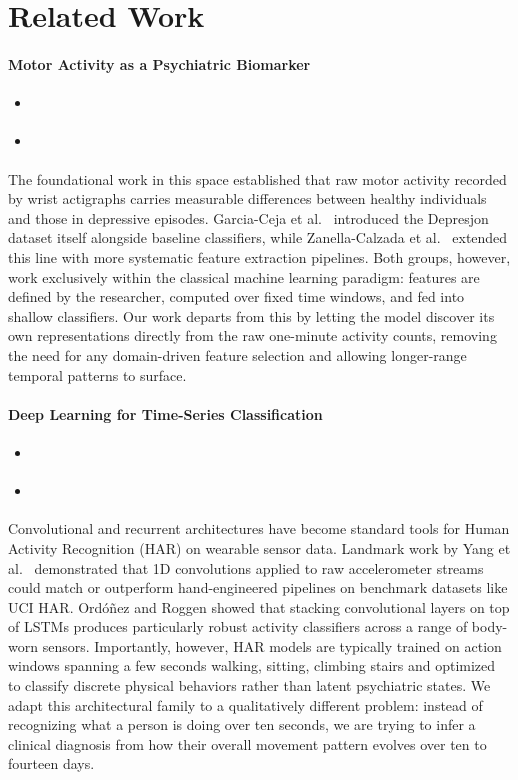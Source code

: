 \section{Related Work}

\paragraph{Motor Activity as a Psychiatric Biomarker}
\begin{itemize}
    \item \cite{garcia2018depresjon}
    \item \cite{zanella2019feature}
\end{itemize}
The foundational work in this space established that raw motor activity recorded by wrist actigraphs carries measurable differences between healthy individuals and those in depressive episodes. Garcia-Ceja et al.\ \cite{garcia2018depresjon} introduced the Depresjon dataset itself alongside baseline classifiers, while Zanella-Calzada et al.\ \cite{zanella2019feature} extended this line with more systematic feature extraction pipelines. Both groups, however, work exclusively within the classical machine learning paradigm: features are defined by the researcher, computed over fixed time windows, and fed into shallow classifiers. Our work departs from this by letting the model discover its own representations directly from the raw one-minute activity counts, removing the need for any domain-driven feature selection and allowing longer-range temporal patterns to surface.

\paragraph{Deep Learning for Time-Series Classification}
\begin{itemize}
    \item \cite{yang2015deep}
    \item \cite{ordoñez2016deep}
\end{itemize}
Convolutional and recurrent architectures have become standard tools for Human Activity Recognition (HAR) on wearable sensor data. Landmark work by Yang et al.\ \cite{yang2015deep} demonstrated that 1D convolutions applied to raw accelerometer streams could match or outperform hand-engineered pipelines on benchmark datasets like UCI HAR. Ordóñez and Roggen \cite{ordoñez2016deep} showed that stacking convolutional layers on top of LSTMs produces particularly robust activity classifiers across a range of body-worn sensors. Importantly, however, HAR models are typically trained on action windows spanning a few seconds walking, sitting, climbing stairs and optimized to classify discrete physical behaviors rather than latent psychiatric states. We adapt this architectural family to a qualitatively different problem: instead of recognizing what a person is doing over ten seconds, we are trying to infer a clinical diagnosis from how their overall movement pattern evolves over ten to fourteen days.

